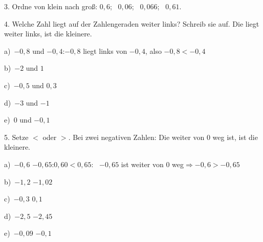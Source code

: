 \documentclass[11pt]{article}
\newcommand{\grau}[1]{{\color{mbgrau}#1}}
\begin{document}
\begin{pfaufg}{}{3.}{}
Ordne von klein nach groß: $0{,}6$; \ $0{,}06$; \ $0{,}066$; \ $0{,}61$.
\end{pfaufg}

\begin{pfaufg}{}{4.}{}
Welche Zahl liegt auf der Zahlengeraden weiter links? Schreib sie auf. Die liegt weiter links, ist die kleinere.\par\smallskip
\grau{a)\ $-0{,}8$ und $-0{,}4$:\quad $-0{,}8$ liegt links von $-0{,}4$, also $-0{,}8 < -0{,}4$}\par\medskip
\noindent\begin{minipage}[t]{0.48\linewidth}\raggedright
b)\ $-2$ und $1$\linie{25mm}
\end{minipage}\hfill
\begin{minipage}[t]{0.48\linewidth}\raggedright
c)\ $-0{,}5$ und $0{,}3$\linie{25mm}
\end{minipage}\par\smallskip
\noindent\begin{minipage}[t]{0.48\linewidth}\raggedright
d)\ $-3$ und $-1$\linie{25mm}
\end{minipage}\hfill
\begin{minipage}[t]{0.48\linewidth}\raggedright
e)\ $0$ und $-0{,}1$\linie{25mm}
\end{minipage}\par\smallskip
{}
\end{pfaufg}

\begin{pfaufg}{}{5.}{}
Setze $<$ oder $>$. Bei zwei negativen Zahlen: Die weiter von 0 weg ist, ist die kleinere.\par\smallskip
\grau{a)\ $-0{,}6$ \fbox{\phantom{$<$}} $-0{,}65$:\quad $0{,}60 < 0{,}65$: \ $-0{,}65$ ist weiter von 0 weg\quad$\Rightarrow$\quad $-0{,}6 > -0{,}65$}\par\medskip
\noindent\begin{minipage}[t]{0.48\linewidth}\raggedright
b)\ $-1{,}2$ \fbox{\phantom{$<$}} $-1{,}02$\linie{25mm}
\end{minipage}\hfill
\begin{minipage}[t]{0.48\linewidth}\raggedright
c)\ $-0{,}3$ \fbox{\phantom{$<$}} $0{,}1$\linie{25mm}
\end{minipage}\par\smallskip
\noindent\begin{minipage}[t]{0.48\linewidth}\raggedright
d)\ $-2{,}5$ \fbox{\phantom{$<$}} $-2{,}45$\linie{25mm}
\end{minipage}\hfill
\begin{minipage}[t]{0.48\linewidth}\raggedright
e)\ $-0{,}09$ \fbox{\phantom{$<$}} $-0{,}1$\linie{25mm}
\end{minipage}\par\smallskip
{}
\end{pfaufg}
\end{document}
